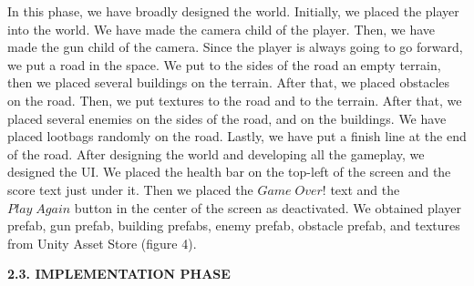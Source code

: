 \documentclass[a4paper]{article}
\begin{document}
\begin{minipage}{\dimexpr\textwidth-1cm}
\hspace{0.5cm} In this phase, we have broadly designed the world. Initially, we placed the player into the world. We have made the camera child of the player. Then, we have made the gun child of the camera. Since the player is always going to go forward, we put a road in the space. We put to the sides of the road an empty terrain, then we placed several buildings on the terrain. After that, we placed obstacles on the road. Then, we put textures to the road and to the terrain. After that, we placed several enemies on the sides of the road, and on the buildings. We have placed lootbags randomly on the road. Lastly, we have put a finish line at the end of the road. After designing the world and developing all the gameplay, we designed the UI. We placed the health bar on the top-left of the screen and the score text just under it. Then we placed the $Game\; Over!$ text and the $Play\; Again$ button in the center of the screen as deactivated. We obtained player prefab, gun prefab, building prefabs, enemy prefab, obstacle prefab, and textures from Unity Asset Store (figure 4).
\end{minipage} \vspace{0.5cm}

\newpage

\indent \textbf{2.3. IMPLEMENTATION PHASE}\\
\end{document}
